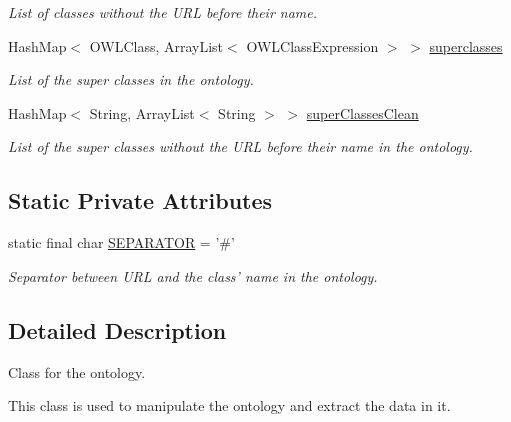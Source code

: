 \begin{DoxyCompactItemize}
\begin{DoxyCompactList}\small\item\em List of classes without the URL before their name. \end{DoxyCompactList}\item 
HashMap$<$ OWLClass, ArrayList$<$ OWLClassExpression $>$ $>$ \hyperlink{class_ontology_1_1_ontology_a0a5224da294ff4af352081031305f799}{superclasses}
\begin{DoxyCompactList}\small\item\em List of the super classes in the ontology. \end{DoxyCompactList}\item 
HashMap$<$ String, ArrayList$<$ String $>$ $>$ \hyperlink{class_ontology_1_1_ontology_a08165d8cd889ef937321671134aae060}{superClassesClean}
\begin{DoxyCompactList}\small\item\em List of the super classes without the URL before their name in the ontology. \end{DoxyCompactList}\end{DoxyCompactItemize}
\subsection*{Static Private Attributes}
\begin{DoxyCompactItemize}
\item 
\hypertarget{class_ontology_1_1_ontology_a29aacc9f40d4659c925e80641995a561}{
static final char \hyperlink{class_ontology_1_1_ontology_a29aacc9f40d4659c925e80641995a561}{SEPARATOR} = '\#'}
\label{class_ontology_1_1_ontology_a29aacc9f40d4659c925e80641995a561}

\begin{DoxyCompactList}\small\item\em Separator between URL and the class' name in the ontology. \end{DoxyCompactList}\end{DoxyCompactItemize}


\subsection{Detailed Description}
Class for the ontology. 

This class is used to manipulate the ontology and extract the data in it. 

